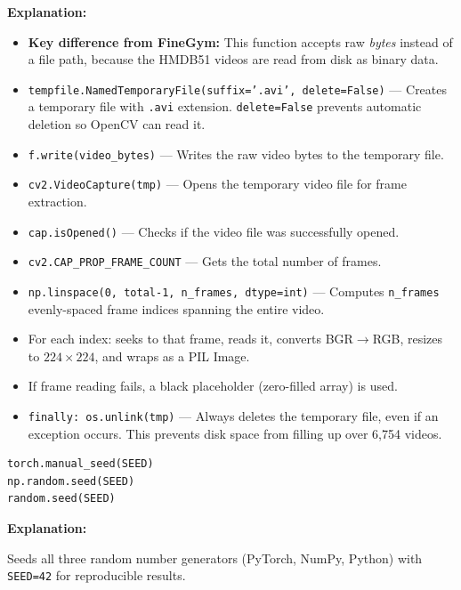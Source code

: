 \documentclass[a4paper, 12pt]{article}
\newenvironment{explanation}{%
  \par\smallskip
  \noindent\textcolor{blue!70!black}{\textbf{Explanation:}}\\
  \noindent
}{\par\medskip}
\begin{document}
\begin{explanation}
\begin{itemize}[nosep]
  \item \textbf{Key difference from FineGym:} This function accepts raw \textit{bytes} instead of a file path, because the HMDB51 videos are read from disk as binary data.
  \item \texttt{tempfile.NamedTemporaryFile(suffix='.avi', delete=False)} --- Creates a temporary file with \texttt{.avi} extension. \texttt{delete=False} prevents automatic deletion so OpenCV can read it.
  \item \texttt{f.write(video\_bytes)} --- Writes the raw video bytes to the temporary file.
  \item \texttt{cv2.VideoCapture(tmp)} --- Opens the temporary video file for frame extraction.
  \item \texttt{cap.isOpened()} --- Checks if the video file was successfully opened.
  \item \texttt{cv2.CAP\_PROP\_FRAME\_COUNT} --- Gets the total number of frames.
  \item \texttt{np.linspace(0, total-1, n\_frames, dtype=int)} --- Computes \texttt{n\_frames} evenly-spaced frame indices spanning the entire video.
  \item For each index: seeks to that frame, reads it, converts BGR$\to$RGB, resizes to $224 \times 224$, and wraps as a PIL Image.
  \item If frame reading fails, a black placeholder (zero-filled array) is used.
  \item \texttt{finally: os.unlink(tmp)} --- Always deletes the temporary file, even if an exception occurs. This prevents disk space from filling up over 6,754 videos.
\end{itemize}
\end{explanation}

\begin{lstlisting}
torch.manual_seed(SEED)
np.random.seed(SEED)
random.seed(SEED)
\end{lstlisting}

\begin{explanation}
Seeds all three random number generators (PyTorch, NumPy, Python) with \texttt{SEED=42} for reproducible results.
\end{explanation}

\newpage
\end{document}
